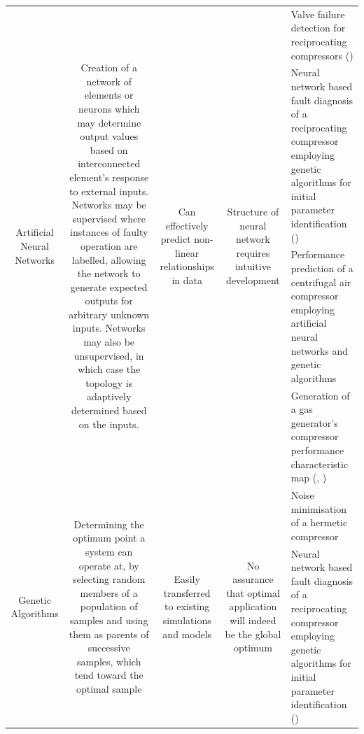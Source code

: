 \begin{center}
\begin{longtable}{p{}p{}p{}p{}p{}}
        
    \multicolumn{1}{c}{\multirow{4}[0]{.18\textwidth}{Artificial Neural Networks}} & \multicolumn{1}{c}{\multirow{4}[0]{.18\textwidth}{Creation of a network of elements or neurons which may determine output values based on interconnected element's response to external inputs. Networks may be supervised where instances of faulty operation are labelled, allowing the network to generate expected outputs for arbitrary unknown inputs. Networks may also be unsupervised, in which case the topology is adaptively determined based on the inputs.}} & \multicolumn{1}{c}{\multirow{4}[0]{.18\textwidth}{Can effectively predict non-linear relationships in data}} & \multicolumn{1}{c}{\multirow{4}[0]{.18\textwidth}{Structure of neural network requires intuitive development}} & Valve failure detection for reciprocating compressors (\cite{Namdeo2008}) \\
    \multicolumn{1}{c}{} & \multicolumn{1}{c}{} & \multicolumn{1}{c}{} & \multicolumn{1}{c}{} & Neural network based fault diagnosis of a reciprocating compressor employing genetic algorithms for initial parameter identification (\cite{Jinru2008})\\
    \multicolumn{1}{c}{} & \multicolumn{1}{c}{} & \multicolumn{1}{c}{} & \multicolumn{1}{c}{} & Performance prediction of a centrifugal air compressor employing artificial neural networks and genetic algorithms \cite({LuoFangqiong2011})\\
    \multicolumn{1}{c}{} & \multicolumn{1}{c}{} & \multicolumn{1}{c}{} & \multicolumn{1}{c}{} & Generation of a gas generator’s compressor performance characteristic map (\cite{Ghorbanian2009}, \cite{Yu2007})\\
    \midrule
    \multicolumn{1}{c}{\multirow{4}[0]{.18\textwidth}{Genetic Algorithms}} & \multicolumn{1}{c}{\multirow{4}[0]{.18\textwidth}{Determining the optimum point a system can operate at, by selecting random members of a population of samples and using them as parents of successive samples, which tend toward the optimal sample}} & \multicolumn{1}{c}{\multirow{4}[0]{.18\textwidth}{Easily transferred to existing simulations and  models}} & \multicolumn{1}{c}{\multirow{4}[0]{.18\textwidth}{No assurance that optimal application will indeed be the global optimum}} & Noise minimisation of a hermetic compressor \cite{Dasilva2004}\\
    \multicolumn{1}{c}{} & \multicolumn{1}{c}{} & \multicolumn{1}{c}{} & \multicolumn{1}{c}{} & Neural network based fault diagnosis of a reciprocating compressor employing genetic algorithms for initial parameter identification (\cite{Jinru2008}) \\ %

\end{longtable}
\end{center}
